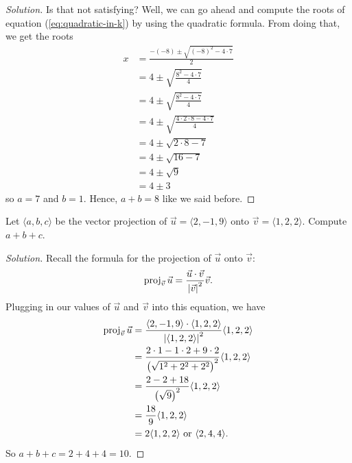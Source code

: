 \begin{proof}[Solution]
Is that not satisfying? Well, we can go ahead and compute the roots of
equation (\ref{eq:quadratic-in-k}) by using the quadratic formula. From
doing that, we get the roots
\begingroup
\allowdisplaybreaks
\begin{align*}
x&=\frac{-(-8)\pm\sqrt{(-8)^2-4\cdot 7}}{2}\\
&=4\pm\sqrt{\frac{8^2-4\cdot 7}{4}}\\
&=4\pm\sqrt{\frac{8^2-4\cdot 7}{4}}\\
&=4\pm\sqrt{\frac{4\cdot 2\cdot 8-4\cdot 7}{4}}\\
&=4\pm\sqrt{2\cdot 8-7}\\
&=4\pm\sqrt{16-7}\\
&=4\pm\sqrt{9}\\
&=4\pm 3
\end{align*}
\endgroup
so $a=7$ and $b=1$. Hence, $\boxed{a+b=8}$ like we said before.
\end{proof}

\begin{problem}
Let $\langle a,b,c\rangle$ be the vector projection of $\vec u=\langle
2,-1,9\rangle$ onto $\vec v=\langle 1,2,2\rangle$. Compute $a+b+c$.
\end{problem}
\begin{proof}[Solution]
Recall the formula for the projection of $\vec u$ onto $\vec v$:
\begin{equation}
  \label{eq:projection-onto}
\operatorname{proj}_{\vec v}\vec u=\frac{\vec u\cdot \vec v}{\left|\vec v\right|^2}\vec v.
\end{equation}
Plugging in our values of $\vec u$ and $\vec v$ into this equation, we have
\begingroup
\allowdisplaybreaks
\begin{align*}
\operatorname{proj}_{\vec v}\vec u
&=\frac{\langle 2,-1,9\rangle\cdot\langle 1,2,2\rangle}
  {\left|\langle 1,2,2\rangle\right|^2}\langle 1,2,2\rangle\\
&=\frac{2\cdot 1-1\cdot2+9\cdot 2}
{\left(\sqrt{1^2+2^2+2^2}\right)^2}\langle 1,2,2\rangle\\
&=\frac{2-2+18}{\left(\sqrt{9}\right)^2}\langle 1,2,2\rangle\\
&=\frac{18}{9}\langle 1,2,2\rangle\\
&=\text{$2\langle 1,2,2\rangle$ or $\langle 2,4,4\rangle$.}
\end{align*}
\endgroup
So $\boxed{a+b+c=2+4+4=10}$.
\end{proof}


